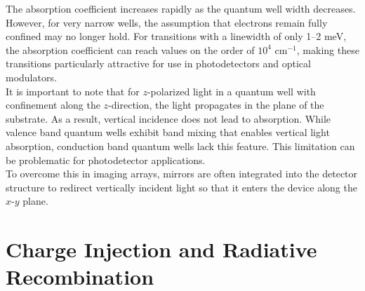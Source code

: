 The absorption coefficient increases rapidly as the quantum well width decreases. However, for very narrow wells, the assumption that electrons remain fully confined may no longer hold. For transitions with a linewidth of only 1–2 meV, the absorption coefficient can reach values on the order of $10^4$ cm$^{-1}$, making these transitions particularly attractive for use in photodetectors and optical modulators.\\
It is important to note that for $z$-polarized light in a quantum well with confinement along the $z$-direction, the light propagates in the plane of the substrate. As a result, vertical incidence does not lead to absorption. While valence band quantum wells exhibit band mixing that enables vertical light absorption, conduction band quantum wells lack this feature. This limitation can be problematic for photodetector applications. \\
To overcome this in imaging arrays, mirrors are often integrated into the detector structure to redirect vertically incident light so that it enters the device along the $x$-$y$ plane.


\section{Charge Injection and Radiative Recombination}
